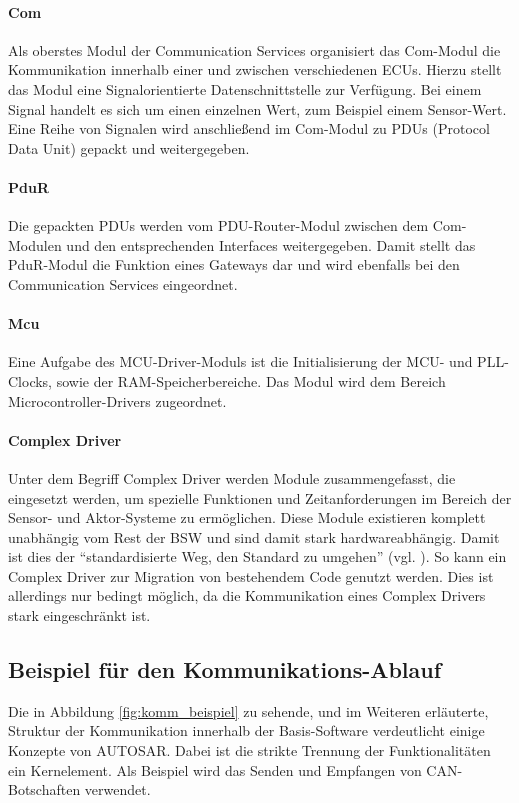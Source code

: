 \documentclass[
  a4paper,					    %
  twoside,
  DIV=calc,     				%
  bibliography=totoc,
  cleardoublepage=empty,
  ngerman,     					%
  final       					%
]{scrbook}
\begin{document}
\paragraph{Com}
Als oberstes Modul der Communication Services organisiert das Com-Modul die Kommunikation innerhalb einer und zwischen verschiedenen ECUs. Hierzu stellt das Modul eine Signalorientierte Datenschnittstelle zur Verfügung. Bei einem Signal handelt es sich um einen einzelnen Wert, zum Beispiel einem Sensor-Wert. Eine Reihe von Signalen wird anschließend im Com-Modul zu PDUs (Protocol Data Unit) gepackt und weitergegeben.

\paragraph{PduR}
Die gepackten PDUs werden vom PDU-Router-Modul zwischen dem Com-Modulen und den entsprechenden Interfaces weitergegeben. Damit stellt das PduR-Modul die Funktion eines Gateways dar und wird ebenfalls bei den Communication Services eingeordnet.

\paragraph{Mcu}
Eine Aufgabe des MCU-Driver-Moduls ist die Initialisierung der MCU- und PLL-Clocks, sowie der RAM-Speicherbereiche. Das Modul wird dem Bereich Microcontroller-Drivers zugeordnet.

\paragraph{Complex Driver}
Unter dem Begriff Complex Driver werden Module zusammengefasst, die eingesetzt werden, um spezielle Funktionen und Zeitanforderungen im Bereich der Sensor- und Aktor-Systeme zu ermöglichen. Diese Module existieren komplett unabhängig vom Rest der BSW und sind damit stark hardwareabhängig. Damit ist dies der "`standardisierte Weg, den Standard zu umgehen"' (vgl. \cite[Seite 227]{SE_Autosar}). So kann ein Complex Driver zur Migration von bestehendem Code genutzt werden. Dies ist allerdings nur bedingt möglich, da die Kommunikation eines Complex Drivers stark eingeschränkt ist.


\subsection{Beispiel für den Kommunikations-Ablauf}
\label{sec:beispiel_komm}
Die in Abbildung \ref{fig:komm_beispiel} zu sehende, und im Weiteren erläuterte, Struktur der Kommunikation innerhalb der Basis-Software verdeutlicht einige Konzepte von AUTOSAR. Dabei ist die strikte Trennung der Funktionalitäten ein Kernelement. Als Beispiel wird das Senden und Empfangen von CAN-Botschaften verwendet.
\end{document}
